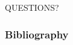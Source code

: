 \documentclass[xcolor=svgnames]{beamer}
\begin{document}
\begin{frame}
	\begin{center}
		{\Huge QUESTIONS?}
	\end{center}
\end{frame}
\begin{frame}[allowframebreaks]
	\frametitle<presentation>{Bibliography}
	
	\nocite{Jarusek2013thesis}
	
\end{frame}
\end{document}
